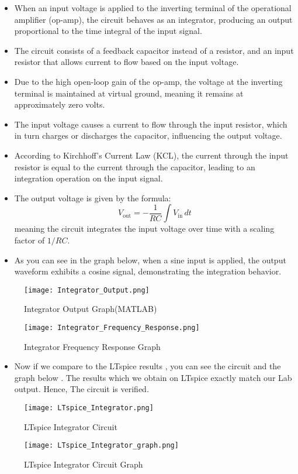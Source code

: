 \documentclass[9pt,conference]{IEEEtran}
\begin{document}
\begin{itemize}
    \item When an input voltage is applied to the inverting terminal of the operational amplifier (op-amp), the circuit behaves as an integrator, producing an output proportional to the time integral of the input signal.
    \item The circuit consists of a feedback capacitor instead of a resistor, and an input resistor that allows current to flow based on the input voltage.
    \item Due to the high open-loop gain of the op-amp, the voltage at the inverting terminal is maintained at virtual ground, meaning it remains at approximately zero volts.
    \item The input voltage causes a current to flow through the input resistor, which in turn charges or discharges the capacitor, influencing the output voltage.
    \item According to Kirchhoff’s Current Law (KCL), the current through the input resistor is equal to the current through the capacitor, leading to an integration operation on the input signal.
    \item The output voltage is given by the formula:  
      \[
      V_{\text{out}} = -\frac{1}{RC} \int V_{\text{in}} \, dt
      \]
      meaning the circuit integrates the input voltage over time with a scaling factor of \( 1/RC \).
    \item As you can see in the graph below, when a sine input is applied, the output waveform exhibits a cosine signal, demonstrating the integration behavior.
\end{itemize}


\begin{figure}[H]
    \centering
    \texttt{[image: Integrator\_Output.png]}
    \caption{Integrator Output Graph(MATLAB)}
    \label{fig:positive_clamper}
\end{figure}


\begin{figure}[H]
    \centering
    \texttt{[image: Integrator\_Frequency\_Response.png]}
    \caption{Integrator Frequency Response Graph}
    \label{fig:positive_clamper}
\end{figure}

\begin{itemize}
    \item Now if we compare to the LTspice results , you can see the circuit and the graph below . The results which we obtain on LTspice exactly match our Lab output. Hence, The circuit is verified.
\end{itemize}
\begin{figure}[H]
    \centering
    \texttt{[image: LTspice\_Integrator.png]}
    \caption{LTspice Integrator Circuit}
    \label{fig:positive_clamper}
\end{figure}
\begin{figure}[H]
    \centering
    \texttt{[image: LTspice\_Integrator\_graph.png]}
    \caption{LTspice Integrator Circuit Graph}
    \label{fig:positive_clamper}
\end{figure}
\end{document}

